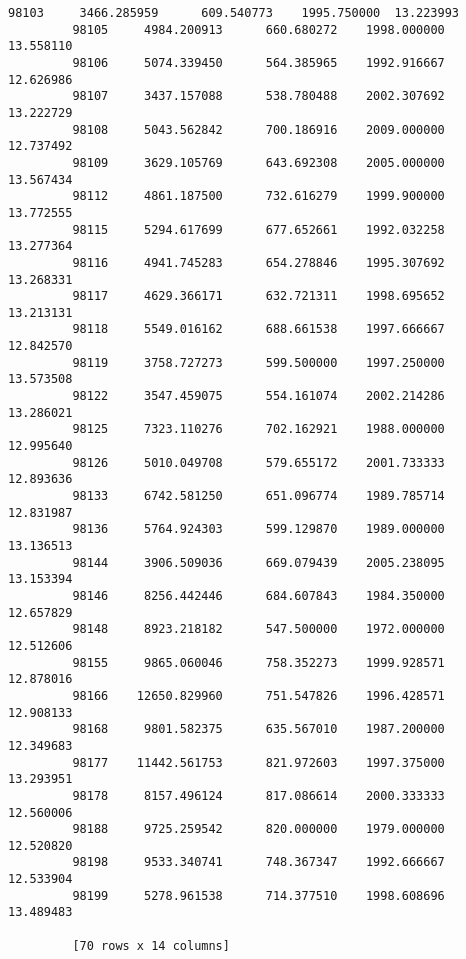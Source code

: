 \documentclass[11pt]{article}
\begin{document}
\begin{Verbatim}[commandchars=\\\{\}]
         98103     3466.285959      609.540773    1995.750000  13.223993  
         98105     4984.200913      660.680272    1998.000000  13.558110  
         98106     5074.339450      564.385965    1992.916667  12.626986  
         98107     3437.157088      538.780488    2002.307692  13.222729  
         98108     5043.562842      700.186916    2009.000000  12.737492  
         98109     3629.105769      643.692308    2005.000000  13.567434  
         98112     4861.187500      732.616279    1999.900000  13.772555  
         98115     5294.617699      677.652661    1992.032258  13.277364  
         98116     4941.745283      654.278846    1995.307692  13.268331  
         98117     4629.366171      632.721311    1998.695652  13.213131  
         98118     5549.016162      688.661538    1997.666667  12.842570  
         98119     3758.727273      599.500000    1997.250000  13.573508  
         98122     3547.459075      554.161074    2002.214286  13.286021  
         98125     7323.110276      702.162921    1988.000000  12.995640  
         98126     5010.049708      579.655172    2001.733333  12.893636  
         98133     6742.581250      651.096774    1989.785714  12.831987  
         98136     5764.924303      599.129870    1989.000000  13.136513  
         98144     3906.509036      669.079439    2005.238095  13.153394  
         98146     8256.442446      684.607843    1984.350000  12.657829  
         98148     8923.218182      547.500000    1972.000000  12.512606  
         98155     9865.060046      758.352273    1999.928571  12.878016  
         98166    12650.829960      751.547826    1996.428571  12.908133  
         98168     9801.582375      635.567010    1987.200000  12.349683  
         98177    11442.561753      821.972603    1997.375000  13.293951  
         98178     8157.496124      817.086614    2000.333333  12.560006  
         98188     9725.259542      820.000000    1979.000000  12.520820  
         98198     9533.340741      748.367347    1992.666667  12.533904  
         98199     5278.961538      714.377510    1998.608696  13.489483  
         
         [70 rows x 14 columns]
\end{Verbatim}
            
\end{document}
